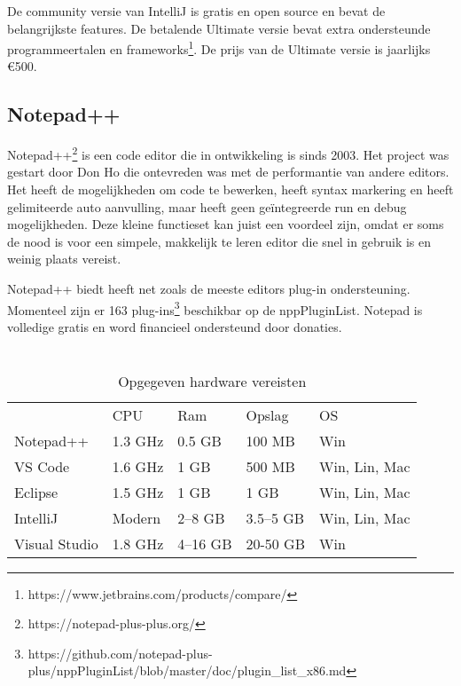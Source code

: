 De community versie van IntelliJ is gratis en open source en bevat de belangrijkste features. De betalende Ultimate versie bevat extra ondersteunde programmeertalen en frameworks\footnote{https://www.jetbrains.com/products/compare/}. De prijs van de Ultimate versie is jaarlijks €500.

\subsection{Notepad++}
Notepad++\footnote{https://notepad-plus-plus.org/} is een code editor die in ontwikkeling is sinds 2003. Het project was gestart door Don Ho die ontevreden was met de performantie van andere editors. Het heeft de mogelijkheden om code te bewerken, heeft syntax markering en heeft gelimiteerde auto aanvulling, maar heeft geen geïntegreerde run en debug mogelijkheden. Deze kleine functieset kan juist een voordeel zijn, omdat er soms de nood is voor een simpele, makkelijk te leren editor die snel in gebruik is en weinig plaats vereist. 

Notepad++ biedt heeft net zoals de meeste editors plug-in ondersteuning. Momenteel zijn er 163 plug-ins\footnote{https://github.com/notepad-plus-plus/nppPluginList/blob/master/doc/plugin\_list\_x86.md} beschikbar op de nppPluginList. Notepad is volledige gratis en word financieel ondersteund door donaties. 

\newpage

\section{}
\label{sec:IDE-prominent}

\begin{table}[h!]
    \begin{tabular}{lllll}
        & CPU         & Ram     & Opslag  & OS                       \\
        Notepad++     & 1.3 GHz & 0.5 GB   & 100 MB   & Win           \\
        VS Code       & 1.6 GHz & 1 GB     & 500 MB   & Win, Lin, Mac \\
        Eclipse       & 1.5 GHz & 1 GB     & 1 GB     & Win, Lin, Mac \\
        IntelliJ      & Modern  & 2–8 GB   & 3.5–5 GB & Win, Lin, Mac \\
        Visual Studio & 1.8 GHz & 4–16 GB  & 20-50 GB & Win          
    \end{tabular}
    \caption{Opgegeven hardware vereisten}
    \label{fig:requirementsTable}
\end{table}


